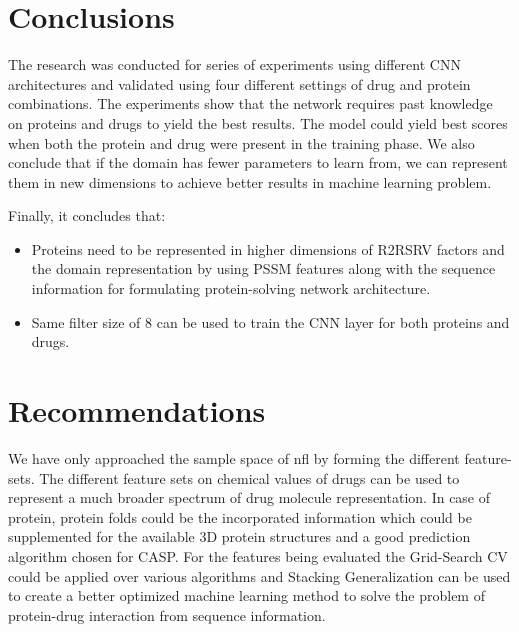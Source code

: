 \chapter{Conclusions}

The research was conducted for series of experiments using different CNN architectures and validated using four different settings of drug and protein combinations. The experiments show that the network requires past knowledge on proteins and drugs to yield the best results. The model could yield best scores when both the protein and drug were present in the training phase. We also conclude that if the domain has fewer parameters to learn from, we can represent them in new dimensions to achieve better results in machine learning problem.

Finally, it concludes that:
\begin{itemize}
    \item Proteins need to be represented in higher dimensions of R2RSRV factors and the domain representation by using PSSM features along with the sequence information for formulating protein-solving network architecture.
    \item Same filter size of 8 can be used to train the CNN layer for both proteins and drugs.
\end{itemize}

\chapter{Recommendations}

We have only approached the sample space of \acrfull{nfl} by forming the different feature-sets. The different feature sets on chemical values of drugs can be used to represent a much broader spectrum of drug molecule representation. In case of protein, protein folds could be the incorporated information which could be supplemented for the available 3D protein structures and a good prediction algorithm chosen for CASP\citep{CASP82008}. For the features being evaluated the Grid-Search CV could be applied over various algorithms and Stacking Generalization can be used to create a better optimized machine learning method to solve the problem of protein-drug interaction from sequence information.

